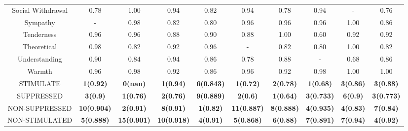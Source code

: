 \begin{table}[ht]
\begin{center}
\begin{tabular}{c@{\hspace{2pt}}c@{\hspace{2pt}}c@{\hspace{2pt}}c@{\hspace{2pt}}c@{\hspace{2pt}}c@{\hspace{2pt}}c@{\hspace{2pt}}c@{\hspace{2pt}}c@{\hspace{2pt}}c}
\small Social Withdrawal & \cellcolor{red!20} 0.78 & \cellcolor{blue!20} 1.00 & \cellcolor{blue!20} 0.94 & \cellcolor{red!20} 0.82 & \cellcolor{blue!20} 0.94 & \cellcolor{red!20} 0.78 & \cellcolor{blue!20} 0.94 & - & \cellcolor{red!20} 0.76  \\
\small Sympathy & - & \cellcolor{blue!20} 0.98 & \cellcolor{red!20} 0.82 & \cellcolor{blue!50} 0.80 & \cellcolor{red!20} 0.96 & \cellcolor{red!20} 0.96 & \cellcolor{red!20} 0.96 & \cellcolor{blue!20} 1.00 & \cellcolor{red!20} 0.86  \\
\small Tenderness & \cellcolor{red!20} 0.96 & \cellcolor{blue!20} 0.96 & \cellcolor{red!20} 0.88 & \cellcolor{blue!20} 0.90 & \cellcolor{red!20} 0.88 & \cellcolor{red!20} 1.00 & \cellcolor{blue!50} 0.60 & \cellcolor{blue!50} 0.92 & \cellcolor{red!20} 0.92  \\
\small Theoretical & \cellcolor{red!20} 0.98 & \cellcolor{blue!20} 0.82 & \cellcolor{red!20} 0.92 & \cellcolor{red!50} 0.96 & - & \cellcolor{red!20} 0.82 & \cellcolor{blue!20} 0.80 & \cellcolor{red!50} 1.00 & \cellcolor{red!20} 0.82  \\
\small Understanding & \cellcolor{blue!20} 0.90 & \cellcolor{red!20} 0.84 & \cellcolor{blue!20} 0.94 & \cellcolor{blue!20} 0.86 & \cellcolor{blue!20} 0.78 & \cellcolor{blue!20} 0.88 & - & \cellcolor{red!20} 0.68 & \cellcolor{blue!20} 0.86  \\
\small Warmth & \cellcolor{gray!20} 0.96 & \cellcolor{gray!20} 0.98 & \cellcolor{gray!20} 0.92 & \cellcolor{blue!50} 0.86 & \cellcolor{gray!20} 0.96 & \cellcolor{gray!20} 0.92 & \cellcolor{gray!20} 0.98 & \cellcolor{blue!20} 1.00 & \cellcolor{gray!20} 1.00  \\
 \midrule
\cellcolor{red!50} STIMULATE & \textbf{1(0.92)} & \textbf{0(nan)} & \textbf{1(0.94)} & \textbf{6(0.843)} & \textbf{1(0.72)} & \textbf{2(0.78)} & \textbf{1(0.68)} & \textbf{3(0.86)} & \textbf{3(0.88)}  \\
\cellcolor{blue!50} SUPPRESSED & \textbf{3(0.9)} & \textbf{1(0.76)} & \textbf{2(0.76)} & \textbf{9(0.889)} & \textbf{2(0.6)} & \textbf{1(0.64)} & \textbf{3(0.733)} & \textbf{6(0.9)} & \textbf{3(0.773)}  \\
\cellcolor{red!20} NON-SUPPRESSED & \textbf{10(0.904)} & \textbf{2(0.91)} & \textbf{8(0.91)} & \textbf{1(0.82)} & \textbf{11(0.887)} & \textbf{8(0.888)} & \textbf{4(0.935)} & \textbf{4(0.83)} & \textbf{7(0.84)}  \\
\cellcolor{blue!20} NON-STIMULATED & \textbf{5(0.888)} & \textbf{15(0.901)} & \textbf{10(0.918)} & \textbf{4(0.91)} & \textbf{5(0.868)} & \textbf{6(0.88)} & \textbf{7(0.891)} & \textbf{7(0.94)} & \textbf{4(0.92)}  \\

\end{tabular}
\end{center}
\end{table}
